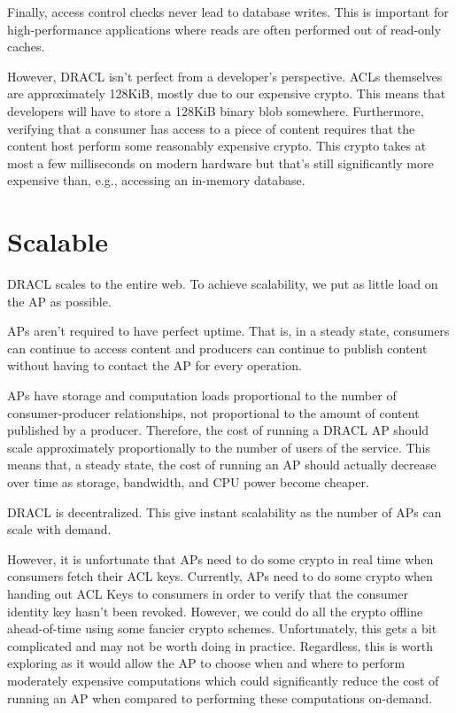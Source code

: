\documentclass[pdftex,12pt,a4papaer,twoside,notitlepage]{report}
\begin{document}
Finally, access control checks never lead to database writes. This is important
for high-performance applications where reads are often performed out of
read-only caches.

However, DRACL isn't perfect from a developer's perspective. ACLs themselves are
approximately 128KiB, mostly due to our expensive crypto. This means that
developers will have to store a 128KiB binary blob somewhere. Furthermore,
verifying that a consumer has access to a piece of content requires that the
content host perform some reasonably expensive crypto. This crypto takes at most
a few milliseconds on modern hardware but that's still significantly more
expensive than, e.g., accessing an in-memory database.

\section{Scalable}

DRACL scales to the entire web. To achieve scalability, we put as little load on
the AP as possible.

APs aren't required to have perfect uptime. That is, in a steady state,
consumers can continue to access content and producers can continue to publish
content without having to contact the AP for every operation.

APs have storage and computation loads proportional to the number of
consumer-producer relationships, not proportional to the amount of content
published by a producer. Therefore, the cost of running a DRACL AP should scale
approximately proportionally to the number of users of the service. This means
that, a steady state, the cost of running an AP should actually decrease over
time as storage, bandwidth, and CPU power become cheaper.

DRACL is decentralized. This give instant scalability as the number of APs can
scale with demand.

However, it is unfortunate that APs need to do some crypto in real time when
consumers fetch their ACL keys. Currently, APs need to do some crypto when
handing out ACL Keys to consumers in order to verify that the consumer identity
key hasn't been revoked. However, we could do all the crypto offline
ahead-of-time using some fancier crypto schemes. Unfortunately, this gets a bit
complicated and may not be worth doing in practice. Regardless, this is worth
exploring as it would allow the AP to choose when and where to perform
moderately expensive computations which could significantly reduce the cost of
running an AP when compared to performing these computations on-demand.
\end{document}
